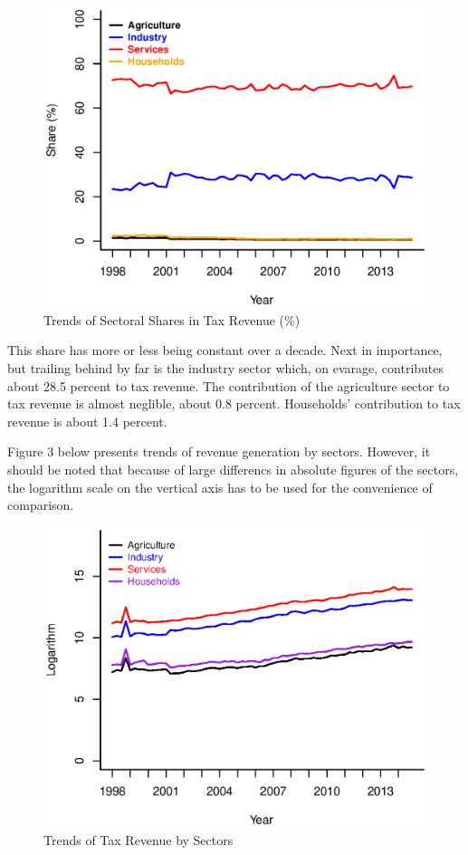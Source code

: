 \documentclass[12pt,a4paper,final]{article}
\begin{document}
\begin{figure}[h]
\centering
\begin{small}
\caption{Trends of Sectoral Shares in Tax Revenue (\%)}
\end{small}
\includegraphics[scale=0.501]{rev_sec_shares.eps} 
\end{figure}

This share has more or less being constant over a decade. Next in importance, but trailing behind by far is the industry sector which, on evarage, contributes about 28.5 percent to tax revenue. The contribution of the agriculture sector to tax revenue is almost neglible, about 0.8 percent.  Households' contribution to tax revenue is about 1.4 percent.

\newpage
Figure 3 below presents trends of revenue generation by sectors. However, it should be noted that because of large differencs in absolute figures of the sectors, the logarithm scale on the vertical axis has to be used for the convenience of comparison.

\begin{figure}[ht]
\centering
\begin{small}
\caption{Trends of Tax Revenue by Sectors}
\end{small}
\includegraphics[scale=0.501]{rev_sec_trends.eps} 
\end{figure}
\end{document}
